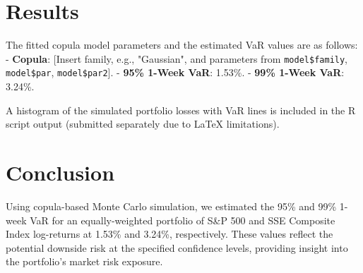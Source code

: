 \documentclass[a4paper,10pt]{article}
\begin{document}
\section{Results}
The fitted copula model parameters and the estimated VaR values are as follows:
- \textbf{Copula}: [Insert family, e.g., "Gaussian", and parameters from \texttt{model\$family}, \texttt{model\$par}, \texttt{model\$par2}].
- \textbf{95\% 1-Week VaR}: 1.53\%.
- \textbf{99\% 1-Week VaR}: 3.24\%.

A histogram of the simulated portfolio losses with VaR lines is included in the R script output (submitted separately due to LaTeX limitations).

\section{Conclusion}
Using copula-based Monte Carlo simulation, we estimated the 95\% and 99\% 1-week VaR for an equally-weighted portfolio of S\&P 500 and SSE Composite Index log-returns at 1.53\% and 3.24\%, respectively. These values reflect the potential downside risk at the specified confidence levels, providing insight into the portfolio's market risk exposure.
\end{document}
